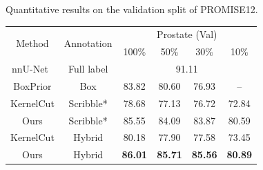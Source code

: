     \begin{table}[t!]
        \centering
        {Quantitative results on the validation split of PROMISE12.}
        \label{tab:val_res}        
            \begin{tabular}{c|c|c c c c}
                \toprule
                \multirow{2}{*}{Method} & \multirow{2}{*}{Annotation} & \multicolumn{4}{c}{Prostate (Val)} \\ %
                &                        & 100\% & 50\% & 30\% & 10\%\\ 
                \midrule
                nnU-Net~\cite{isensee2019automated}     & Full label        & \multicolumn{4}{c}{91.11} \\ \cmidrule{1-6}
                
                
                
                BoxPrior\cite{kervadec2020bounding}    & Box           & 83.82           & 80.60         & 76.93 & --    \\ 
                KernelCut\cite{tang2018regularized}   & Scribble*          & 78.68           & 77.13         & 76.72 & 72.84 \\ 
                Ours & Scribble* & 85.55 & 84.09 & 83.87 & 80.59 \\
                KernelCut\cite{tang2018regularized}   & Hybrid          & 80.18           & 77.90         & 77.58 & 73.45 \\ 
                Ours        & Hybrid            & \textbf{86.01}         & \textbf{85.71}         & \textbf{85.56}          & \textbf{80.89}           \\ 
                \bottomrule
            \end{tabular}
    \end{table}

